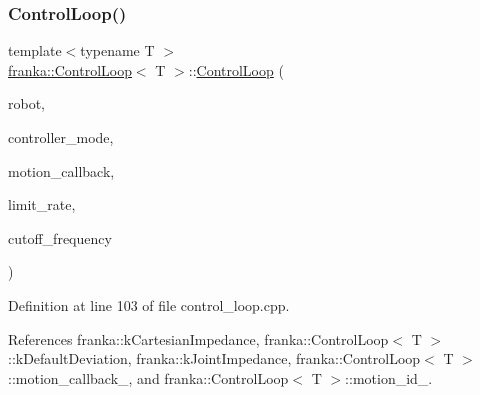 \subsubsection{\texorpdfstring{Control\+Loop()}{ControlLoop()}\hspace{0.1cm}{\footnotesize\ttfamily [2/3]}}
{\footnotesize\ttfamily template$<$typename T $>$ \\
\hyperlink{classfranka_1_1ControlLoop}{franka\+::\+Control\+Loop}$<$ T $>$\+::\hyperlink{classfranka_1_1ControlLoop}{Control\+Loop} (\begin{DoxyParamCaption}\item[{\hyperlink{classfranka_1_1RobotControl}{Robot\+Control} \&}]{robot,  }\item[{\hyperlink{namespacefranka_a3e20bc77587e2c0c53598753e3f4816b}{Controller\+Mode}}]{controller\+\_\+mode,  }\item[{\hyperlink{classfranka_1_1ControlLoop_a23624d5a86fe2b206986af4757ba1822}{Motion\+Generator\+Callback}}]{motion\+\_\+callback,  }\item[{\hyperlink{classbool}{bool}}]{limit\+\_\+rate,  }\item[{double}]{cutoff\+\_\+frequency }\end{DoxyParamCaption})}



Definition at line 103 of file control\+\_\+loop.\+cpp.



References franka\+::k\+Cartesian\+Impedance, franka\+::\+Control\+Loop$<$ T $>$\+::k\+Default\+Deviation, franka\+::k\+Joint\+Impedance, franka\+::\+Control\+Loop$<$ T $>$\+::motion\+\_\+callback\+\_\+, and franka\+::\+Control\+Loop$<$ T $>$\+::motion\+\_\+id\+\_\+.


